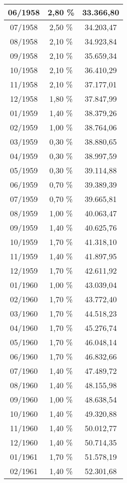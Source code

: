 \begin{center}
\begin{longtable}{|c|c|c|}
06/1958 & 2,80 \% & 33.366,80 \\ \hline
07/1958 & 2,50 \% & 34.203,47 \\ \hline
08/1958 & 2,10 \% & 34.923,84 \\ \hline
09/1958 & 2,10 \% & 35.659,34 \\ \hline
10/1958 & 2,10 \% & 36.410,29 \\ \hline
11/1958 & 2,10 \% & 37.177,01 \\ \hline
12/1958 & 1,80 \% & 37.847,99 \\ \hline
01/1959 & 1,40 \% & 38.379,26 \\ \hline
02/1959 & 1,00 \% & 38.764,06 \\ \hline
03/1959 & 0,30 \% & 38.880,65 \\ \hline
04/1959 & 0,30 \% & 38.997,59 \\ \hline
05/1959 & 0,30 \% & 39.114,88 \\ \hline
06/1959 & 0,70 \% & 39.389,39 \\ \hline
07/1959 & 0,70 \% & 39.665,81 \\ \hline
08/1959 & 1,00 \% & 40.063,47 \\ \hline
09/1959 & 1,40 \% & 40.625,76 \\ \hline
10/1959 & 1,70 \% & 41.318,10 \\ \hline
11/1959 & 1,40 \% & 41.897,95 \\ \hline
12/1959 & 1,70 \% & 42.611,92 \\ \hline
01/1960 & 1,00 \% & 43.039,04 \\ \hline
02/1960 & 1,70 \% & 43.772,40 \\ \hline
03/1960 & 1,70 \% & 44.518,23 \\ \hline
04/1960 & 1,70 \% & 45.276,74 \\ \hline
05/1960 & 1,70 \% & 46.048,14 \\ \hline
06/1960 & 1,70 \% & 46.832,66 \\ \hline
07/1960 & 1,40 \% & 47.489,72 \\ \hline
08/1960 & 1,40 \% & 48.155,98 \\ \hline
09/1960 & 1,00 \% & 48.638,54 \\ \hline
10/1960 & 1,40 \% & 49.320,88 \\ \hline
11/1960 & 1,40 \% & 50.012,77 \\ \hline
12/1960 & 1,40 \% & 50.714,35 \\ \hline
01/1961 & 1,70 \% & 51.578,19 \\ \hline
02/1961 & 1,40 \% & 52.301,68 \\ \hline

\end{longtable}
\end{center}
